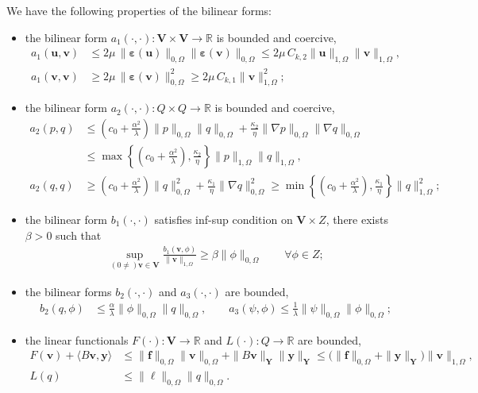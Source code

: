 \documentclass[smallextended]{svjour3}
\numberwithin{equation}{section}
\numberwithin{figure}{section}
\numberwithin{table}{section}
\newcommand\bV{\mathbf{V}}
\newcommand\ff{\boldsymbol{f}}
\newcommand\bg{\boldsymbol{g}}
\newcommand\beps{\boldsymbol{\varepsilon}}
\newcommand\by{\boldsymbol{y}}
\newcommand\bu{\boldsymbol{u}}
\newcommand\bv{\boldsymbol{v}}
\newcommand{\bY}{\boldsymbol{Y}}
\newcommand{\bbR}{\mathbb{R}}
\begin{document}
	
	\noindent We have the following properties of the bilinear forms:
	\begin{itemize}
		\item the bilinear form $a_{1}( \cdot, \cdot): \bV \times \bV \to \bbR$ is bounded and coercive,
			\begin{align*}
				a_{1}( \bu, \bv) & \le 2 \mu \, \| \beps(\bu)\|_{0, \Omega} \| \beps(\bv) \|_{0, \Omega} \le 2 \mu \, C_{k,2} \| \bu \|_{1, \Omega} \| \bv \|_{1, \Omega}, \\
				a_{1}( \bv, \bv) & \ge 2 \mu \, \| \beps(\bv)\|_{0, \Omega}^2 \ge 2 \mu \, C_{k,1} \| \bv \|_{1, \Omega}^2;
			\end{align*}
			
		\item the bilinear form $a_{2}( \cdot, \cdot): Q \times Q \to \bbR$ is bounded and coercive,
		\begin{align*}
			a_{2}( p, q) & \le \left( c_0 + \frac{\alpha^2}{\lambda} \right) \|p\|_{0, \Omega} \|q \|_{0, \Omega} + \frac{\kappa_2}{\eta}  \|\nabla p\|_{0, \Omega} \| \nabla q \|_{0, \Omega} \\
			& \le \max \left\{ \left( c_0 + \frac{\alpha^2}{\lambda} \right),  \frac{\kappa_2}{\eta} \right\} \|p \|_{1, \Omega}\|q \|_{1, \Omega}, \\
			a_{2}( q, q) & \ge \left( c_0 + \frac{\alpha^2}{\lambda} \right) \|q \|_{0, \Omega}^2 + \frac{\kappa_1}{\eta} \| \nabla q \|_{0, \Omega}^2 \ge \min \left\{\left( c_0 + \frac{\alpha^2}{\lambda} \right),  \frac{\kappa_1}{\eta} \right\} \|q \|_{1, \Omega}^2;
		\end{align*}
		
		\item the bilinear form $b_1(\cdot, \cdot)$ satisfies inf-sup condition on $\bV \times Z$, there exists $\beta>0$ such that
		\begin{align*}
			\sup_{(0 \neq) \bv \in \bV} \frac{b_1(\bv, \phi)}{\| \bv \|_{1, \Omega}} \ge \beta \| \phi \|_{0, \Omega} \qquad \forall \phi \in Z;
		\end{align*}
		\item the bilinear forms $b_2(\cdot, \cdot)$ and $a_3(\cdot, \cdot)$ are bounded,
		\begin{align*}
				b_2(q, \phi)&\le \frac{\alpha}{{\lambda}} \|\phi\|_{0, \Omega} \| q \|_{0, \Omega}, \qquad
			a_3(\psi, \phi) \le  \frac{1}{{\lambda}} \|\psi\|_{0, \Omega} \|\phi \|_{0, \Omega};
		\end{align*}
		\item the linear functionals $F(\cdot): \bV \to \bbR$ and $L(\cdot): Q \to \bbR$ are bounded,
		\begin{align*}
			F(\bv) + \langle B \bv, \by \rangle & \le \|\ff \|_{0, \Omega} \|\bv\|_{0, \Omega} 
            + \| B \bv\|_{\bY} \| \by \|_{\bY} 
            \le \big(  \|\ff \|_{0, \Omega} 
            + \| \by \|_{\bY}  \big) \|\bv\|_{1, \Omega},\\
			L(q)& \le \| \ell \|_{0, \Omega}\| q \|_{0, \Omega}.
		\end{align*}
\end{itemize}
	
\end{document}
